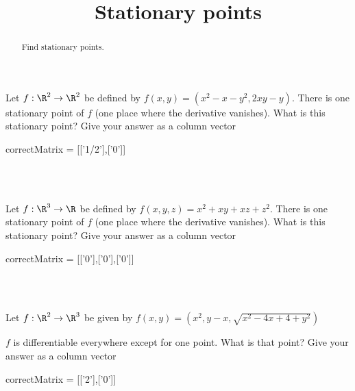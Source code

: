 \documentclass{ximera}
\title{Stationary points}
\begin{document}
	\begin{abstract}
		Find stationary points.
	\end{abstract}
	
	\begin{question}
		Let $f:\R^2 \to \R^2$ be defined by $f(x,y) = (x^2-x-y^2,2xy-y) $.
		There is one stationary point of $f$ (one place where the derivative vanishes).  
		What is this stationary point?  Give your answer as a column vector
		 
		 \begin{matrix-answer}
		 correctMatrix = [['1/2'],['0']]
		 \end{matrix-answer}
	\end{question}
	\\
	\\
	\begin{question}
		Let $f:\R^3 \to \R$ be defined by $f(x,y,z) = x^2+xy+xz+z^2 $.
		There is one stationary point of $f$ (one place where the derivative vanishes).  
		What is this stationary point?  Give your answer as a column vector
		 
		 \begin{matrix-answer}
		 correctMatrix = [['0'],['0'],['0']]
		 \end{matrix-answer}
	\end{question}
	\\
	\\
	\begin{question}
		Let $f:\R^2 \to \R^3$ be given by $f(x,y) = (x^2,y-x,\sqrt{x^2-4x+4+y^2})$
		\begin{question}
			$f$ is differentiable everywhere except for one point.  What is that point?  Give your answer as a column vector
			\begin{matrix-answer}
			correctMatrix = [['2'],['0']]
			\end{matrix-answer}
		\end{question}
	\end{question}
\end{document}
